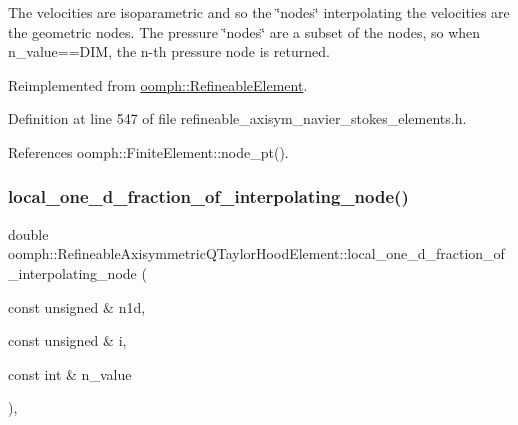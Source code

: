 The velocities are isoparametric and so the \char`\"{}nodes\char`\"{} interpolating the velocities are the geometric nodes. The pressure \char`\"{}nodes\char`\"{} are a subset of the nodes, so when n\+\_\+value==D\+IM, the n-\/th pressure node is returned. 



Reimplemented from \hyperlink{classoomph_1_1RefineableElement_ab27986fc2f6033a4758662cde78a7b76}{oomph\+::\+Refineable\+Element}.



Definition at line 547 of file refineable\+\_\+axisym\+\_\+navier\+\_\+stokes\+\_\+elements.\+h.



References oomph\+::\+Finite\+Element\+::node\+\_\+pt().

\mbox{\label{classoomph_1_1RefineableAxisymmetricQTaylorHoodElement_afab94536fc743be9392f97a482a9307c}} 
\subsubsection{\texorpdfstring{local\+\_\+one\+\_\+d\+\_\+fraction\+\_\+of\+\_\+interpolating\+\_\+node()}{local\_one\_d\_fraction\_of\_interpolating\_node()}}
{\footnotesize\ttfamily double oomph\+::\+Refineable\+Axisymmetric\+Q\+Taylor\+Hood\+Element\+::local\+\_\+one\+\_\+d\+\_\+fraction\+\_\+of\+\_\+interpolating\+\_\+node (\begin{DoxyParamCaption}\item[{const unsigned \&}]{n1d,  }\item[{const unsigned \&}]{i,  }\item[{const int \&}]{n\+\_\+value }\end{DoxyParamCaption})\hspace{0.3cm}{\ttfamily [inline]}, {\ttfamily [virtual]}}



